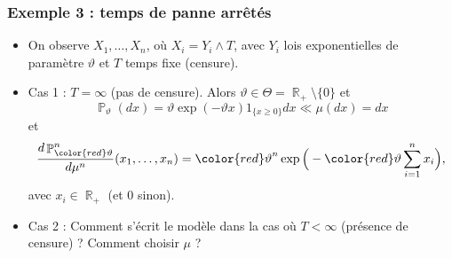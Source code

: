 ﻿\documentclass{beamer}
\DeclareMathOperator{\R}{{\mathbb R}}
\DeclareMathOperator{\PP}{{\mathbb P}}
\begin{document}
\begin{frame}
\frametitle{Exemple 3 : temps de panne \og arrêtés\fg{}}
\begin{itemize}
\item On observe $X_1,\ldots, X_n$, où $X_i = Y_i \wedge T$, avec $Y_i$ {\color{red}lois exponentielles} de paramètre $\vartheta$ et $T$ {\color{red}temps fixe} (censure).
\item Cas 1 : $T=\infty$ (pas de censure). Alors  $\vartheta \in \Theta = \R_+\setminus \{0\}$ et
$$\PP_\vartheta(dx) = \vartheta \exp(-\vartheta x)1_{\{x \geq 0\}}dx \ll \mu(dx) = dx$$
et
$$\frac{d\PP_{\color{red}\vartheta}^n}{d\mu^n}(x_1,\ldots,x_n) = {\color{red}\vartheta}^n \exp\Big(-{\color{red}\vartheta} \sum_{i = 1}^n x_i\Big),$$
{\color{red}avec $x_i \in \R_+$} (et $0$ sinon).
\item Cas 2 : {\color{red}Comment s'écrit le modèle} dans la cas où $T<\infty$ (présence de censure) ? Comment choisir $\mu$ ?
\end{itemize}
\end{frame}
\end{document}

